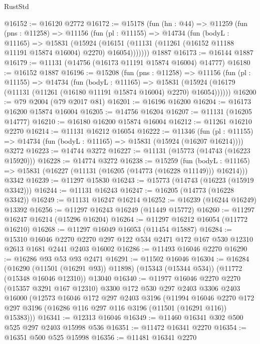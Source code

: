 \begin{lexlean}{RustStd}
\begin{coremodule}
@16152 := @16120 @2772
@16172 := @15178
    (fun (hn : @44) =>
    @11259
      (fun (pns : @11258) =>
      @11156
        (fun (pl : @11155) =>
        @14734
          (fun (bodyL : @11165) =>
          @15831
            (@15924
              (@16151 (@11131 (@11261 (@16152 @11188 @11191 @15874 @16004) @2270) @16054)))))))
    @1887
@16173 := @16144 @1887
@16179 := @11131 (@14756 (@16173 @11191 @15874 @16004) @14777)
@16180 := @16152 @1887
@16196 := @15208
    (fun (pns : @11258) =>
    @11156
      (fun (pl : @11155) =>
      @14734
        (fun (bodyL : @11165) =>
        @15831 (@15924 (@16179 (@11131 (@11261 (@16180 @11191 @15874 @16004) @2270) @16054))))))
@16200 := @79 @2004 (@79 @2017 @81)
@16201 := @16196 @16200
@16204 := @16173 @16200 @15874 @16004
@16205 := @14756 @16204
@16207 := @11131 (@16205 @14777)
@16210 := @16180 @16200 @15874 @16004
@16212 := @11261 @16210 @2270
@16214 := @11131 @16212 @16054
@16222 := @11346
    (fun (pl : @11155) => @14734 (fun (bodyL : @11165) => @15831 (@15924 (@16207 @16214))))
    @3272
@16223 := @14744 @3272
@16227 := @11131 (@15773 (@14743 (@16223 @15920)))
@16228 := @14774 @3272
@16238 := @15259
    (fun (bodyL : @11165) => @15831 (@16227 (@11131 (@16205 (@14773 (@16228 @11149))) @16214)))
    @3342
@16239 := @11297 @15830
@16243 := @15773 (@14743 (@16223 (@15919 @3342)))
@16244 := @11131 @16243
@16247 := @16205 (@14773 (@16228 @3342))
@16249 := @11131 @16247 @16214
@16252 := @16239 (@16244 @16249) @13392
@16256 := @11297 @16243 @16249 (@11449 @15772)
@16260 := @11297 @16247 @16214 (@15296 @16204)
@16264 := @11297 @16212 @16054 (@11772 @16210)
@16268 := @11297 @16049 @16053 (@11454 @15887)
@16284 := @15310
    @16046
    @2270
    @2270
    @297
    @122
    @534
    @2471
    @172
    @167
    @530
    @12310
    @2613
    @1681
    @2441
    @2403
    @16002
@16286 := @11493 @16046 @2270
@16290 := @16286 @93 @53 @93 @2471
@16291 := @11502 @16046
@16304 := @16284
    (@16290 (@11501 (@16291 @93)) @11898)
    (@15343 (@15344 @534))
    (@11772 (@15348 @16046 @12310))
    @13040
@16340 := @11977
    @16046
    @2270
    @2270
    (@15357 @3291 @167 @12310)
    @3300
    @172
    @530
    @297
    @2403
    @3306
    @2403
    @16000
    (@12573
      @16046
      @172
      @297
      @2403
      @3196
      (@11994
        @16046
        @2270
        @172
        @297
        @3196
        (@16286 @116 @297 @116 @3196 (@11501 (@16291 @116)) @15383)))
@16341 := @12313 @16046
@16349 := @11460 @16341 @302 @500 @525 @297 @2403 @15998 @536
@16351 := @11472 @16341 @2270
@16354 := @16351 @500 @525 @15998
@16356 := @11481 @16341 @2270

\end{coremodule}
\end{lexlean}
